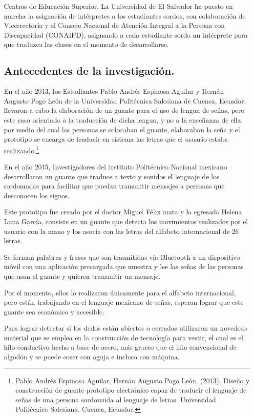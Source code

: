 \documentclass[12pt]{report}%
\begin{document}
Centros de Educación Superior.
La Universidad de El Salvador ha puesto en marcha la asignación de intérpretes a los estudiantes sordos, con colaboración de Vicerrectoría y el Consejo Nacional de Atención Integral a la Persona con Discapacidad (CONAIPD), asignando a cada estudiante sordo un intérprete para que traduzca las clases en el momento de desarrollarse.


\subsection{Antecedentes de la investigación.}

En el año 2013, los Estudiantes Pablo Andrés Espinosa Aguilar y Hernán Augusto Pogo León de la Universidad Politécnica Salesiana de Cuenca, Ecuador, llevaron a cabo la elaboración de un guante para el uso de lengua de señas, pero este caso orientado a la traducción de dicha lengua, y no a la enseñanza de ella, por medio del cual las personas se colocaban el guante, elaboraban la seña y el prototipo se encarga de traducir en sistema las letras que el usuario estaba realizando.\footnote{Pablo Andrés Espinosa Aguilar, Hernán Augusto Pogo León. (2013). Diseño y construcción de guante prototipo electrónico capaz de traducir el lenguaje de señas de una persona sordomuda al lenguaje de letras. Universidad Politécnica Salesiana. Cuenca, Ecuador.}

En el año 2015, Investigadores del instituto Politécnico Nacional mexicano desarrollaron un guante que traduce a texto y sonidos el lenguaje de los sordomudos para facilitar que puedan transmitir mensajes a personas que desconocen los signos. 

Este prototipo fue creado por el doctor Miguel Félix mata y la egresada Helena Luna García, consiste en un guante que detecta los movimientos realizados por el usuario con la mano y los asocia con las letras del alfabeto internacional de 26 letras.

Se forman palabras y frases que son trasmitidas vía Bluetooth a un dispositivo móvil con una aplicación precargada que muestra y lee las señas de las personas que usan el guante y quieren transmitir un mensaje.

Por el momento, ellos lo realizaron únicamente para el alfabeto internacional, pero están trabajando en el lenguaje mexicano de señas, esperan lograr que este guante sea económico y accesible.

Para lograr detectar si los dedos están abiertos o cerrados utilizaron un novedoso material que se emplea en la construcción de tecnología para vestir, el cual es el hilo conductivo hecho \newpage a base de acero, más grueso que el hilo convencional de algodón y se puede coser con aguja e incluso con máquina. 
\end{document}
